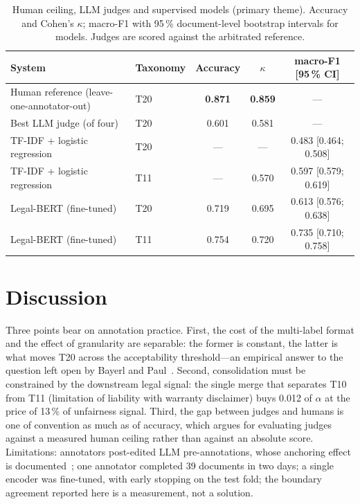 \documentclass{IOS-Book-Article}
\begin{document}
\begin{table}[t]
\caption{Human ceiling, LLM judges and supervised models (primary theme). Accuracy and Cohen's $\kappa$; macro-F1 with 95\,\% document-level bootstrap intervals for models. Judges are scored against the arbitrated reference.}
\label{tab:ceiling}
\centering
\begin{tabular}{llccc}
\toprule
System & Taxonomy & Accuracy & $\kappa$ & macro-F1 [95\,\% CI] \\
\midrule
Human reference (leave-one-annotator-out) & T20 & \textbf{0.871} & \textbf{0.859} & --- \\
Best LLM judge (of four)                   & T20 & 0.601 & 0.581 & --- \\
TF-IDF + logistic regression              & T20 & --- & --- & 0.483 [0.464; 0.508] \\
TF-IDF + logistic regression              & T11 & --- & 0.570 & 0.597 [0.579; 0.619] \\
Legal-BERT (fine-tuned)                   & T20 & 0.719 & 0.695 & 0.613 [0.576; 0.638] \\
Legal-BERT (fine-tuned)                   & T11 & 0.754 & 0.720 & 0.735 [0.710; 0.758] \\
\bottomrule
\end{tabular}
\end{table}

\section{Discussion}
\label{sec:discussion}
Three points bear on annotation practice. First, the cost of the multi-label format and the effect of granularity are separable: the former is constant, the latter is what moves T20 across the acceptability threshold---an empirical answer to the question left open by Bayerl and Paul~\cite{bayerl2011metaanalysis}. Second, consolidation must be constrained by the downstream legal signal: the single merge that separates T10 from T11 (limitation of liability with warranty disclaimer) buys 0.012 of $\alpha$ at the price of 13\,\% of unfairness signal. Third, the gap between judges and humans is one of convention as much as of accuracy, which argues for evaluating judges against a measured human ceiling rather than against an absolute score. Limitations: annotators post-edited LLM pre-annotations, whose anchoring effect is documented~\cite{choi2024llmeffect}; one annotator completed 39 documents in two days; a single encoder was fine-tuned, with early stopping on the test fold; the boundary agreement reported here is a measurement, not a solution.
\end{document}
